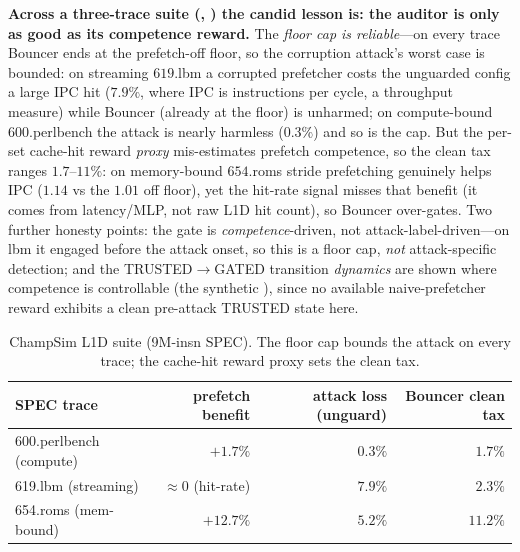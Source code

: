 \documentclass{article}
\begin{document}
\textbf{Across a three-trace suite (, ) the
candid lesson is: the auditor is only as good as its competence reward.} The
\emph{floor cap is reliable}---on every trace Bouncer ends at the prefetch-off
floor, so the corruption attack's worst case is bounded: on streaming $619$.lbm a
corrupted prefetcher costs the unguarded config a large IPC hit ($7.9\%$, where IPC is instructions per cycle, a throughput measure) while Bouncer (already
at the floor) is unharmed; on compute-bound $600$.perlbench the attack is nearly
harmless ($0.3\%$) and so is the cap. But the per-set cache-hit reward
\emph{proxy} mis-estimates prefetch competence, so the clean tax ranges
$1.7$--$11\%$: on memory-bound $654$.roms stride prefetching genuinely helps IPC
($1.14$ vs the $1.01$ off floor), yet the hit-rate signal misses that benefit (it
comes from latency/MLP, not raw L1D hit count), so Bouncer over-gates. Two further
honesty points: the gate is \emph{competence}-driven, not attack-label-driven---on
lbm it engaged before the attack onset, so this is a floor cap, \emph{not}
attack-specific detection; and the TRUSTED$\to$GATED transition \emph{dynamics} are
shown where competence is controllable (the synthetic ), since no
available naive-prefetcher reward exhibits a clean pre-attack TRUSTED state here.

\begin{table}[t]\centering\footnotesize
\caption{ChampSim L1D suite (9M-insn SPEC). The floor cap bounds the attack on
every trace; the cache-hit reward proxy sets the clean tax.}
\label{tab:champsim}
\begin{tabular}{@{}lrrr@{}}
\toprule
SPEC trace & prefetch benefit & attack loss (unguard) & Bouncer clean tax\\
\midrule
600.perlbench (compute) & $+1.7\%$ & $0.3\%$ & $1.7\%$\\
619.lbm (streaming)     & $\approx\!0$ (hit-rate) & $7.9\%$ & $2.3\%$\\
654.roms (mem-bound)    & $+12.7\%$ & $5.2\%$ & $11.2\%$\\
\bottomrule
\end{tabular}
\end{table}
\end{document}
